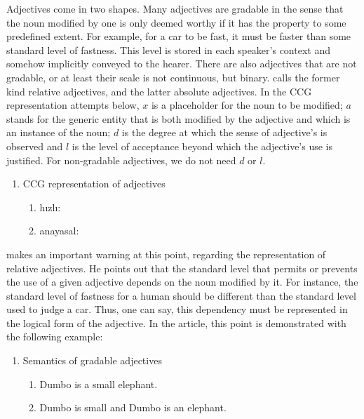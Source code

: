 \documentclass[11pt]{article} %
\begin{document}
Adjectives come in two shapes. Many adjectives are gradable in the sense that the noun modified by one is only deemed worthy if it has the property to some predefined extent. For example, for a car to be fast, it must be faster than some standard level of fastness. This level is stored in each speaker's context and somehow implicitly conveyed to the hearer. There are also adjectives that are not gradable, or at least their scale is not continuous, but binary. \citet{Paoli1999} calls the former kind relative adjectives, and the latter absolute adjectives. In the CCG representation attempts below, $x$ is a placeholder for the noun to be modified; $a$ stands for the generic entity that is both modified by the adjective and which is an instance of the noun; $d$ is the degree at which the sense of adjective's is observed and $l$ is the level of acceptance beyond which the adjective's use is justified. For non-gradable adjectives, we do not need $d$ or $l$.

\begin{enumerate}[resume*]
	\item CCG representation of adjectives  \label{CCGAdj}
	\begin{enumerate}[label=(\alph*), ref=(\alph*)]\itemsep1pt
	\item hızlı:  \label{a}
	\item anayasal:  \label{b}
	\end{enumerate}
\end{enumerate}

\citet{Paoli1999} makes an important warning at this point, regarding the representation of relative adjectives. He points out that the standard level that permits or prevents the use of a given adjective depends on the noun modified by it. For instance, the standard level of fastness for a human should be different than the standard level used to judge a car. Thus, one can say, this dependency must be represented in the logical form of the adjective. In the article, this point is demonstrated with the following example: 

\begin{enumerate}[resume*]
	\item Semantics of gradable adjectives \label{SemGradAdj}
	\begin{enumerate}[label=(\alph*), ref=(\alph*)]\itemsep1pt
	\item Dumbo is a small elephant. \label{a}
	\item Dumbo is small and Dumbo is an elephant. \label{b}
	\end{enumerate}
\end{enumerate}
\end{document}
